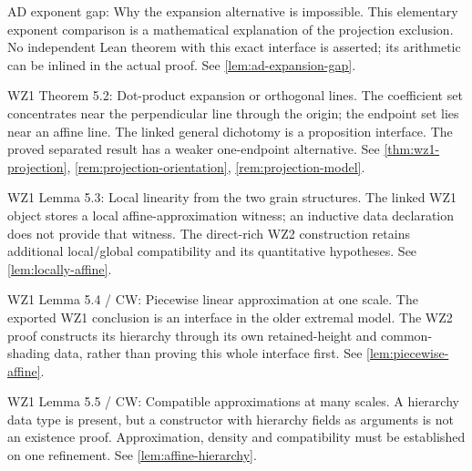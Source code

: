 \begin{remark}
\label{rem:atlas-Iadgap}
AD exponent gap: Why the expansion alternative is impossible.
This elementary exponent comparison is a mathematical explanation of the projection exclusion. No independent Lean theorem with this exact interface is asserted; its arithmetic can be inlined in the actual proof.
See \ref{lem:ad-expansion-gap}.
\end{remark}

\begin{remark}
\label{rem:atlas-T5_2}
WZ1 Theorem 5.2: Dot-product expansion or orthogonal lines.
The coefficient set concentrates near the perpendicular line through the origin; the endpoint set lies near an affine line. The linked general dichotomy is a proposition interface. The proved separated result has a weaker one-endpoint alternative.
See \ref{thm:wz1-projection}, \ref{rem:projection-orientation}, \ref{rem:projection-model}.
\end{remark}

\begin{remark}
\label{rem:atlas-L5_3}
WZ1 Lemma 5.3: Local linearity from the two grain structures.
The linked WZ1 object stores a local affine-approximation witness; an inductive data declaration does not provide that witness. The direct-rich WZ2 construction retains additional local/global compatibility and its quantitative hypotheses.
See \ref{lem:locally-affine}.
\end{remark}

\begin{remark}
\label{rem:atlas-L5_4}
WZ1 Lemma 5.4 / CW: Piecewise linear approximation at one scale.
The exported WZ1 conclusion is an interface in the older extremal model. The WZ2 proof constructs its hierarchy through its own retained-height and common-shading data, rather than proving this whole interface first.
See \ref{lem:piecewise-affine}.
\end{remark}

\begin{remark}
\label{rem:atlas-L5_5}
WZ1 Lemma 5.5 / CW: Compatible approximations at many scales.
A hierarchy data type is present, but a constructor with hierarchy fields as arguments is not an existence proof. Approximation, density and compatibility must be established on one refinement.
See \ref{lem:affine-hierarchy}.
\end{remark}

